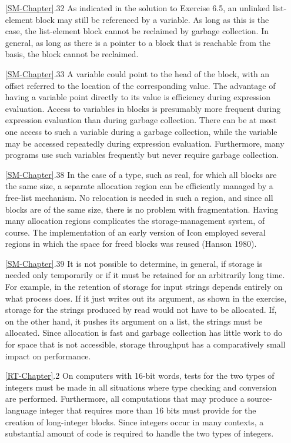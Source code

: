 \begin{itemize}
\goodbreak\item[\ref*{SM-Chapter}.32]
As indicated in the solution to Exercise 6.5, an unlinked list-element
block may still be referenced by a variable. As long as this is the case, the
list-element block cannot be reclaimed by garbage collection. In general,
as long as there is a pointer to a block that is reachable from the basis, the
block cannot be reclaimed.

\goodbreak\item[\ref*{SM-Chapter}.33]
A variable could point to the head of the block, with an offset referred to
the location of the corresponding value. The advantage of having a variable
point directly to its value is efficiency during expression evaluation.
Access to variables in blocks is presumably more frequent during expression
evaluation than during garbage collection. There can be at most one
access to such a variable during a garbage collection, while the variable
may be accessed repeatedly during expression evaluation. Furthermore,
many programs use such variables frequently but never require garbage
collection.

\goodbreak\item[\ref*{SM-Chapter}.38]
In the case of a type, such as real, for which all blocks are the same size, a
separate allocation region can be efficiently managed by a free-list
mechanism. No relocation is needed in such a region, and since all blocks
are of the same size, there is no problem with fragmentation. Having
many allocation regions complicates the storage-management system, of
course. The implementation of an early version of Icon employed several
regions in which the space for freed blocks was reused (Hanson 1980).

\goodbreak\item[\ref*{SM-Chapter}.39]
It is not possible to determine, in general, if storage is needed only temporarily
or if it must be retained for an arbitrarily long time. For example, in
the retention of storage for input strings depends entirely on what process
does. If it just writes out its argument, as shown in the exercise, storage
for the strings produced by read would not have to be allocated. If, on
the other hand, it pushes its argument on a list, the strings must be allocated.
Since allocation is fast and garbage collection has little work to do
for space that is not accessible, storage throughput has a comparatively
small impact on performance.

\goodbreak\item[\ref*{RT-Chapter}.2]
On computers with 16-bit words, tests for the two types of integers must
be made in all situations where type checking and conversion are performed.
Furthermore, all computations that may produce a source-language
integer that requires more than 16 bits must provide for the
creation of long-integer blocks. Since integers occur in many contexts, a
substantial amount of code is required to handle the two types of integers.


\end{itemize}
